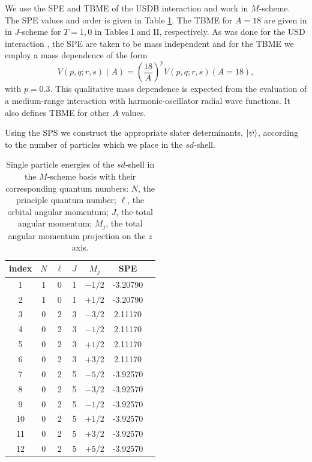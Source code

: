 \documentclass[aps,prl,reprint,groupedaddress]{revtex4-1}  %
\begin{document}
We use the SPE and TBME of the USDB interaction \cite{Brown2006} and work in $M$-scheme. The SPE values and order is given in Table \ref{tab:SPE}. The TBME for $A=18$ are given in \cite{Brown2006} in $J$-scheme for $T=1,0$ in Tables I and II, respectively. As was done for the USD interaction \cite{Wildenthal1984}, the SPE are taken to be mass independent and for the TBME we employ a mass dependence of the form
\begin{equation}
	V(p,q;r,s)(A) = \left( \frac{18}{A} \right)^p V(p,q;r,s)(A=18),
\end{equation}
with $p=0.3$. This qualitative mass dependence is expected from the evaluation of a medium-range interaction with harmonic-oscillator radial wave functions. It also defines TBME for other $A$ values.

Using the SPS we construct the appropriate slater determinants, $\ket{\psi}$, according to the number of particles which we place in the $sd$-shell.

\begin{table}[h]
\caption{Single particle energies of the $sd$-shell in the $M$-scheme basis with their corresponding quantum numbers: $N$, the principle quantum number; $\ell$, the orbital angular momentum; $J$, the total angular momentum; $M_j$, the total angular momentum projection on the $z$ axis. \label{tab:SPE}}
\begin{ruledtabular}
\begin{tabular}{c|cccccc}
index	&	$N$	&	$\ell$	&	$J$	&	$M_j$	&	SPE			\\
\hline 
1		&	1	&	0		&	1	&	$-1/2$	&	-3.20790	\\
2		&	1	&	0		&	1	&	$+1/2$	&	-3.20790	\\
3		& 	0	&	2		&	3	&	$-3/2$	&	 2.11170	\\
4		&	0	&	2		&	3	&	$-1/2$	&	 2.11170	\\
5		&	0	&	2		&	3	&	$+1/2$	&	 2.11170	\\
6		&	0	&	2		&	3	&	$+3/2$	&	 2.11170	\\
7		&	0	&	2		&	5	&	$-5/2$	&	-3.92570	\\
8		&	0	&	2		&	5	&	$-3/2$	&	-3.92570	\\
9		&	0	&	2		&	5	&	$-1/2$	&	-3.92570	\\
10		&	0	&	2		&	5	&	$+1/2$	&	-3.92570	\\
11		&	0	&	2		&	5	&	$+3/2$	&	-3.92570	\\
12		&	0	&	2		&	5	&	$+5/2$	&	-3.92570	
\end{tabular}
\end{ruledtabular}
\end{table}
\end{document}
